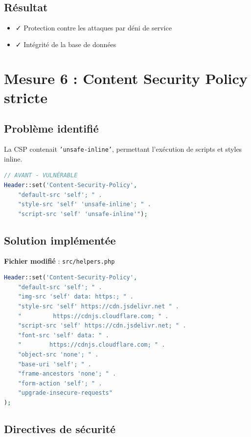 \documentclass[11pt,a4paper,french]{report}
\begin{document}
\subsection{Résultat}

\begin{itemize}
    \item ✓ Protection contre les attaques par déni de service
    \item ✓ Intégrité de la base de données
\end{itemize}

\newpage

\section{Mesure 6 : Content Security Policy stricte}

\subsection{Problème identifié}

La CSP contenait \texttt{'unsafe-inline'}, permettant l'exécution de scripts et styles inline.

\begin{lstlisting}[language=PHP]
// AVANT - VULNÉRABLE
Header::set('Content-Security-Policy', 
    "default-src 'self'; " .
    "style-src 'self' 'unsafe-inline'; " .
    "script-src 'self' 'unsafe-inline'");
\end{lstlisting}

\subsection{Solution implémentée}

\textbf{Fichier modifié} : \texttt{src/helpers.php}

\begin{lstlisting}[language=PHP]
Header::set('Content-Security-Policy',
    "default-src 'self'; " .
    "img-src 'self' data: https:; " .
    "style-src 'self' https://cdn.jsdelivr.net " .
    "         https://cdnjs.cloudflare.com; " .
    "script-src 'self' https://cdn.jsdelivr.net; " .
    "font-src 'self' data: " .
    "        https://cdnjs.cloudflare.com; " .
    "object-src 'none'; " .
    "base-uri 'self'; " .
    "frame-ancestors 'none'; " .
    "form-action 'self'; " .
    "upgrade-insecure-requests"
);
\end{lstlisting}

\subsection{Directives de sécurité}
\end{document}
